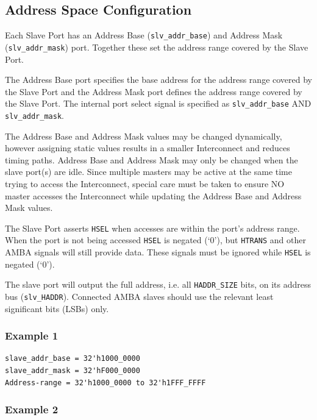 \subsection{Address Space
Configuration}\label{address-space-configuration}

Each Slave Port has an Address Base (\texttt{slv\_addr\_base}) and Address Mask
(\texttt{slv\_addr\_mask}) port. Together these set the address range covered by
the Slave Port.

The Address Base port specifies the base address for the address range
covered by the Slave Port and the Address Mask port defines the address
range covered by the Slave Port. The internal port select signal is
specified as \texttt{slv\_addr\_base} AND \texttt{slv\_addr\_mask}.

The Address Base and Address Mask values may be changed dynamically,
however assigning static values results in a smaller Interconnect and
reduces timing paths. Address Base and Address Mask may only be changed
when the slave port(s) are idle. Since multiple masters may be active at
the same time trying to access the Interconnect, special care must be
taken to ensure NO master accesses the Interconnect while updating the
Address Base and Address Mask values.

The Slave Port asserts \texttt{HSEL} when accesses are within the port's address
range. When the port is not being accessed \texttt{HSEL} is negated (`0'), but
\texttt{HTRANS} and other AMBA signals will still provide data. These signals
must be ignored while \texttt{HSEL} is negated (`0').

The slave port will output the full address, i.e. all \texttt{HADDR\_SIZE} bits,
on its address bus (\texttt{slv\_HADDR}). Connected AMBA slaves should use the
relevant least significant bits (LSBs) only.

\pagebreak

\subsubsection{Example 1}\label{example-1}

\begin{verbatim}
slave_addr_base = 32'h1000_0000
slave_addr_mask = 32'hF000_0000
Address-range = 32'h1000_0000 to 32'h1FFF_FFFF
\end{verbatim}

\subsubsection{Example 2}\label{example-2}

